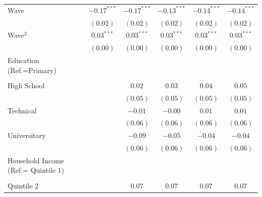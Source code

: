\documentclass[
  12pt,
  a4paper,
]{article}
\begin{document}
\begin{table}[!ht]
\begin{center}
{\begin{tabular}{l c c c c c c}
Wave                                &               & $-0.17^{***}$ & $-0.17^{***}$ & $-0.13^{***}$ & $-0.14^{***}$ & $-0.14^{***}$ \\
                                    &               & $(0.02)$      & $(0.02)$      & $(0.02)$      & $(0.02)$      & $(0.02)$      \\
Wave$^2$                            &               & $0.03^{***}$  & $0.03^{***}$  & $0.03^{***}$  & $0.03^{***}$  & $0.03^{***}$  \\
                                    &               & $(0.00)$      & $(0.00)$      & $(0.00)$      & $(0.00)$      & $(0.00)$      \\
Education (Ref.=Primary)            &               &               &               &               &               &               \\
                                    &               &               &               &               &               &               \\
\quad High School                   &               &               & $0.02$        & $0.03$        & $0.04$        & $0.05$        \\
                                    &               &               & $(0.05)$      & $(0.05)$      & $(0.05)$      & $(0.05)$      \\
\quad Technical                     &               &               & $-0.01$       & $-0.00$       & $0.01$        & $0.01$        \\
                                    &               &               & $(0.06)$      & $(0.06)$      & $(0.06)$      & $(0.06)$      \\
\quad Universitary                  &               &               & $-0.09$       & $-0.05$       & $-0.04$       & $-0.04$       \\
                                    &               &               & $(0.06)$      & $(0.06)$      & $(0.06)$      & $(0.06)$      \\
Household Income (Ref.= Quintile 1) &               &               &               &               &               &               \\
                                    &               &               &               &               &               &               \\
\quad Quintile 2                    &               &               & $0.07$        & $0.07$        & $0.07$        & $0.07$        \\

\end{tabular}}
\end{center}
\end{table}
\end{document}
